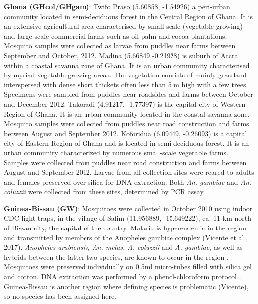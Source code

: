 \documentclass[a4paper,11pt,abstracton,hidelinks]{scrartcl}
\begin{document}
%
\textbf{Ghana (GHcol/GHgam)}: Twifo Praso (5.60858, -1.54926) a peri-urban community located in semi-deciduous forest in the Central Region of Ghana.
%
It is an extensive agricultural area characterised by small-scale (vegetable growing) and large-scale commercial farms such as oil palm and cocoa plantations.
%
Mosquito samples were collected as larvae from puddles near farms between September and October, 2012.
%
Madina (5.66849	-0.21928) is suburb of Accra within a coastal savanna zone of Ghana. 
%
It is an urban community characterised by myriad vegetable-growing areas.
%
The vegetation consists of mainly grassland interspersed with dense short thickets often less than 5 m high with a few trees.
%
Specimens were sampled from puddles near roadsides and farms between October and December 2012.
%
Takoradi (4.91217, -1.77397) is the capital city of Western Region of Ghana.
%
It is an urban community located in the coastal savanna zone.
%
Mosquito samples were collected from puddles near road construction and farms between August and September 2012.
%
Koforidua (6.09449, -0.26093) is a capital city of Eastern Region of Ghana and is located in semi-deciduous forest. 
%
It is an urban community characterized by numerous small-scale vegetable farms. 
%
Samples were collected from puddles near road construction and farms between August and September 2012.
%
Larvae from all collection sites were reared to adults and females preserved over silica for DNA extraction.
%
Both \textit{An. gambiae} and \textit{An. coluzzii} were collected from these sites, determined by PCR assay \cite{Santolamazza2008}.

%
\textbf{Guinea-Bissau (GW)}: Mosquitoes were collected in October 2010 using indoor CDC light traps, in the village of Safim (11.956889, -15.649222), ca. 11 km north of Bissau city, the capital of the country.
%
Malaria is hyperendemic in the region and transmitted by members of the Anopheles gambiae complex (Vicente et al., 2017).
%
\textit{Anopheles arabiensis, An. melas, A. coluzzii} and \textit{A. gambiae}, as well as hybrids between the latter two species, are known to occur in the region \cite{Gordicho2014, Vicente2017}.
%
Mosquitoes were preserved individually on 0.5ml micro-tubes filled with silica gel and cotton. DNA extraction was performed by a phenol-chloroform protocol \cite{Donnelly1999}.
%
Guinea-Bissau is another region where defining species is problematic (Vicente), so no species has been assigned here.

\end{document}
